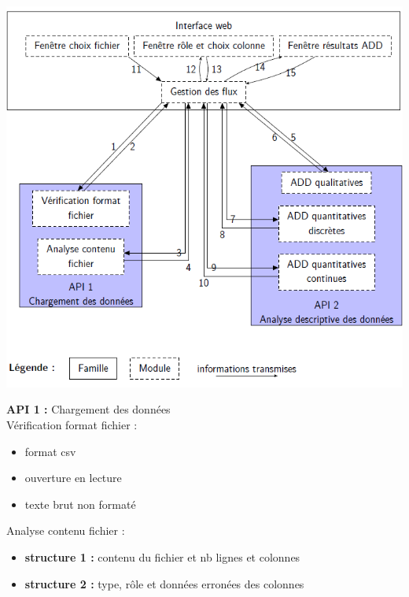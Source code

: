 	\begin{frame}
		\begin{center}\includegraphics[scale=0.43]{org.png}\end{center}
	\end{frame}
	
	\begin{frame}
		\textbf{API 1 :} Chargement des données\\
		Vérification format fichier :
		\begin{itemize}
			\item format csv
			\item ouverture en lecture
			\item texte brut non formaté
		\end{itemize} \pause
		Analyse contenu fichier :
		\begin{itemize}
			\item \textbf{structure 1 :} contenu du fichier et nb lignes et colonnes
			\item \textbf{structure 2 :} type, rôle et données erronées des colonnes
		\end{itemize}		
	\end{frame}
	
